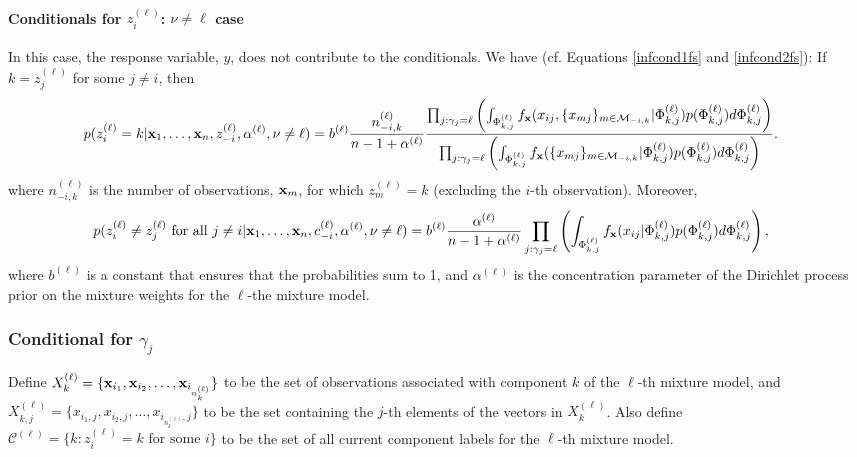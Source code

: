 \documentclass[12pt]{article}
\begin{document}
\paragraph{Conditionals for $z_i^{(\ell)}$: $\nu \ne \ell$ case }
In this case, the response variable, $y$, does not contribute to the conditionals.  We have (cf. Equations \eqref{infcond1fs} and \eqref{infcond2fs}):
\noindent If $k = z_j^{(\ell)}$ for some $j \ne i$, then\qquad
\begin{align}
p(z_i^{(\ell)}=k|{\bf x}_1,\ldots, {\bf x}_n,z_{-i}^{(\ell)}, \alpha^{(\ell)}, \nu \ne \ell) &= b^{(\ell)}\frac{n_{-i,k}^{(\ell)}}{n - 1 + \alpha^{(\ell)}}  \frac{\prod_{j: {\gamma_j} = \ell} \left(\int_{\Phi^{(\ell)}_{k,j}}f_{{\bf x}}(x_{ij},\{{ x}_{mj}\}_{m\in \mathcal{M}_{-i,k}} | \Phi^{(\ell)}_{k,j}) p(\Phi^{(\ell)}_{k,j}) d\Phi^{(\ell)}_{k,j}\right)}{\prod_{j: {\gamma_j} = \ell} \left(\int_{\Phi^{(\ell)}_{k,j}}f_{{\bf x}}(\{{ x}_{mj}\}_{m\in \mathcal{M}_{-i,k}} | \Phi^{(\ell)}_{k,j}) p(\Phi^{(\ell)}_{k,j}) d\Phi^{(\ell)}_{k,j}\right)}. \label{infcond1mc1}
\end{align}
where $n_{-i,k}^{(\ell)}$ is the number of observations, ${\bf x}_m$, for which $z_m^{(\ell)} = k$ (excluding the $i$-th observation).
Moreover, \qquad
\begin{align}
p(z_i^{(\ell)} \ne z_j^{(\ell)} \mbox{ for all } j \ne i| {\bf x}_1,\ldots, {\bf x}_n, c^{(\ell)}_{-i}, \alpha^{(\ell)}, \nu \ne \ell) &= b^{(\ell)}\frac{\alpha^{(\ell)}}{n - 1 + \alpha^{(\ell)}} \prod_{j: {\gamma_j} = \ell} \left(\int_{\Phi^{(\ell)}_{k,j}}f_{{\bf x}}(x_{ij} | \Phi^{(\ell)}_{k,j}) p(\Phi^{(\ell)}_{k,j}) d\Phi^{(\ell)}_{k,j}\right),\label{infcond2mc1}
\end{align}
where $b^{(\ell)}$ is a constant that ensures that the probabilities sum to 1, and $\alpha^{(\ell)}$ is the concentration parameter of the Dirichlet process prior on the mixture weights for the $\ell$-the mixture model.  

\subsubsection{Conditional for $\gamma_j$}
Define $X_{k}^{(\ell)} = \{ {\bf x}_{i_1}, {\bf x}_{i_2}, \ldots, {\bf x}_{i_{n_k^{(\ell)}}} \}$ to be the set of observations associated with component $k$ of the $\ell$-th mixture model, and $X_{k, j}^{(\ell)} = \{ { x}_{i_1,j}, { x}_{i_2,j}, \ldots, { x}_{i_{n_k^{(\ell)}},j} \}$ to be the set containing the $j$-th elements of the vectors in $X_{k}^{(\ell)}$.  Also define $\mathcal{C}^{(\ell)} = \{k:  z_i^{(\ell)} = k \mbox{ for some } i \}$ to be the set of all current component labels for the $\ell$-th mixture model.
\end{document}

